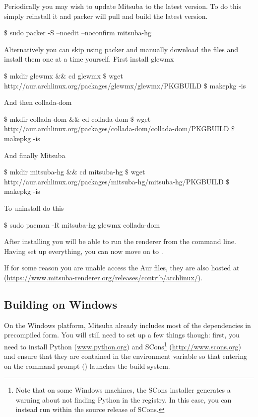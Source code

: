 Periodically you may wish to update Mitsuba to the latest version.
To do this simply reinstall it and packer will pull and build the latest version.
\begin{shell}
$\text{\$}$ sudo packer -S --noedit --noconfirm mitsuba-hg
\end{shell}

Alternatively you can skip using packer and manually download the files and install them one at a time yourself.
First install glewmx
\begin{shell}
$\text{\$}$ mkdir glewmx && cd glewmx
$\text{\$}$ wget http://aur.archlinux.org/packages/glewmx/glewmx/PKGBUILD
$\text{\$}$ makepkg -is
\end{shell}

And then collada-dom
\begin{shell}
$\text{\$}$ mkdir collada-dom && cd collada-dom
$\text{\$}$ wget http://aur.archlinux.org/packages/collada-dom/collada-dom/PKGBUILD
$\text{\$}$ makepkg -is
\end{shell}

And finally Mitsuba
\begin{shell}
$\text{\$}$ mkdir mitsuba-hg && cd mitsuba-hg
$\text{\$}$ wget http://aur.archlinux.org/packages/mitsuba-hg/mitsuba-hg/PKGBUILD
$\text{\$}$ makepkg -is
\end{shell}

To uninstall do this
\begin{shell}
$\text{\$}$ sudo pacman -R mitsuba-hg glewmx collada-dom
\end{shell}
After installing you will be able to run the renderer from the command line.
Having set up everything, you can now move on to .

If for some reason you are unable access the Aur files, they are also hosted at 
(\url{https://www.mitsuba-renderer.org/releases/contrib/archlinux/}).

\subsection{Building on Windows}
On the Windows platform, Mitsuba already includes most of the dependencies in precompiled form.
You will still need to set up a few things though: first, you need to install Python 
(\url{www.python.org}) and SCons\footnote{Note that on some Windows machines, the SCons 
installer generates a warning about not finding Python in the registry. In this case, you can instead run  within the source release of SCons.} (\url{http://www.scons.org}) and ensure that they are contained in the  environment variable so that entering  on the command prompt () launches the build system.

